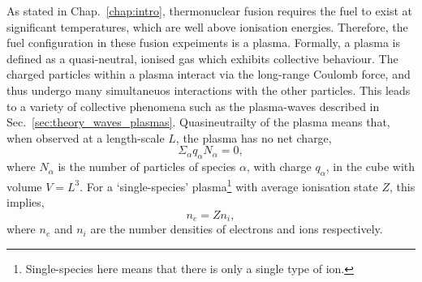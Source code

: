 As stated in Chap.~\ref{chap:intro}, thermonuclear fusion requires the fuel to exist at significant temperatures, which are well above ionisation energies.
Therefore, the fuel configuration in these fusion expeiments is a plasma.
Formally, a plasma is defined as a quasi-neutral, ionised gas which exhibits collective behaviour.
The charged particles within a plasma interact via the long-range Coulomb force, and thus undergo many simultaneuos interactions with the other particles.
This leads to a variety of collective phenomena such as the plasma-waves described in Sec.~\ref{sec:theory_waves_plasmas}.
Quasineutrailty of the plasma means that, when observed at a length-scale $L$, the plasma has no net charge,
\begin{equation}
    \Sigma_{\alpha}q_{\alpha}N_{\alpha} = 0,
\end{equation}
where $N_{\alpha}$ is the number of particles of species $\alpha$, with charge $q_{\alpha}$, in the cube with volume $V=L^3$.
For a `single-species' plasma\footnote{Single-species here means that there is only a single type of ion.} with average ionisation state $Z$, this implies,
\begin{equation}
    n_e = Z n_i,
\end{equation}
where $n_e$ and $n_i$ are the number densities of electrons and ions respectively.

